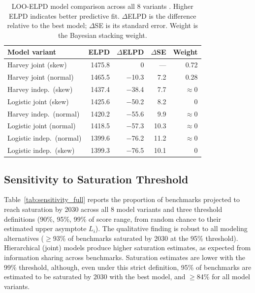 \documentclass[letterpaper,twocolumn]{article}
\begin{document}
{\begin{table}[ht]
\centering
\small
\begin{tabular}{lrrrr}
\toprule
Model variant & ELPD & $\Delta$ELPD & $\Delta$SE & Weight \\
\midrule
Harvey joint (skew) & 1475.8 & 0 & --- & 0.72 \\
Harvey joint (normal) & 1465.5 & $-$10.3 & 7.2 & 0.28 \\
Harvey indep.\ (skew) & 1437.4 & $-$38.4 & 7.7 & $\approx$0 \\
Logistic joint (skew) & 1425.6 & $-$50.2 & 8.2 & 0 \\
Harvey indep.\ (normal) & 1420.2 & $-$55.6 & 9.9 & $\approx$0 \\
Logistic joint (normal) & 1418.5 & $-$57.3 & 10.3 & $\approx$0 \\
Logistic indep.\ (normal) & 1399.6 & $-$76.2 & 11.2 & $\approx$0 \\
Logistic indep.\ (skew) & 1399.3 & $-$76.5 & 10.1 & 0 \\
\bottomrule
\end{tabular}
\caption{LOO-ELPD model comparison across all 8 variants \citep{vehtari_practical_2017}. Higher ELPD indicates better predictive fit. $\Delta$ELPD is the difference relative to the best model; $\Delta$SE is its standard error. Weight is the Bayesian stacking weight.}
\label{tab:loo_comparison}
\end{table}

\subsection{Sensitivity to Saturation Threshold}

Table~\ref{tab:sensitivity_full} reports the proportion of benchmarks projected to reach saturation by 2030 across all 8 model variants and three threshold definitions (90\%, 95\%, 99\% of score range, from random chance to their estimated upper asymptote $L_i$). The qualitative finding is robust to all modeling alternatives ($\geq$93\% of benchmarks saturated by 2030 at the 95\% threshold). Hierarchical (joint) models produce higher saturation estimates, as expected from information sharing across benchmarks. Saturation estimates are lower with the 99\% threshold, although, even under this strict definition, 95\% of benchmarks are estimated to be saturated by 2030 with the best model, and $\geq$84\% for all model variants.

}
\end{document}
